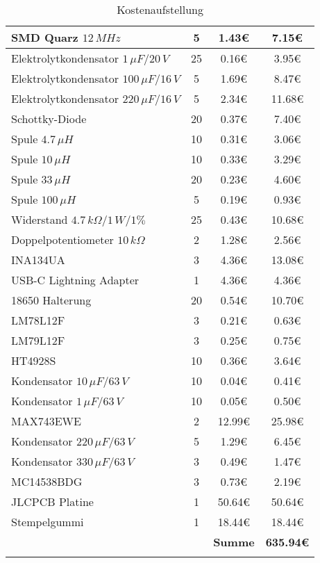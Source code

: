 \begin{longtable}{l|c|c|c}
      {SMD Quarz $12\,MHz$} & {5} & {1.43\euro{}} & {7.15\euro{}} \\
      \hline
      {Elektrolytkondensator $1\,\mu F$/$20\,V$} & {25} & {0.16\euro{}} & {3.95\euro{}} \\
      \hline
      {Elektrolytkondensator $100\,\mu F$/$16\,V$} & {5} & {1.69\euro{}} & {8.47\euro{}} \\
      \hline
      {Elektrolytkondensator  $220\,\mu F$/$16\,V$} & {5} & {2.34\euro{}} & {11.68\euro{}} \\
      \hline
      {Schottky-Diode} & {20} & {0.37\euro{}} & {7.40\euro{}} \\
      \hline
      {Spule $4.7\,\mu H$} & {10} & {0.31\euro{}} & {3.06\euro{}} \\
      \hline
      {Spule $10\,\mu H$} & {10} & {0.33\euro{}} & {3.29\euro{}} \\
      \hline
      {Spule $33\,\mu H$} & {20} & {0.23\euro{}} & {4.60\euro{}} \\
      \hline
      {Spule $100\,\mu H$} & {5} & {0.19\euro{}} & {0.93\euro{}} \\
      \hline
      {Widerstand $4.7\,k\Omega$/$1\,W$/$1\%$} & {25} & {0.43\euro{}} & {10.68\euro{}} \\
      \hline
      {Doppelpotentiometer $10\,k\Omega$} & {2} & {1.28\euro{}} & {2.56\euro{}} \\
      \hline
      {INA134UA} & {3} & {4.36\euro{}} & {13.08\euro{}} \\
      \hline
      {USB-C Lightning Adapter} & {1} & {4.36\euro{}} & {4.36\euro{}} \\
      \hline
      {18650 Halterung} & {20} & {0.54\euro{}} & {10.70\euro{}} \\
      \hline
      {LM78L12F} & {3} & {0.21\euro{}} & {0.63\euro{}} \\
      \hline
      {LM79L12F} & {3} & {0.25\euro{}} & {0.75\euro{}} \\
      \hline
      {HT4928S} & {10} & {0.36\euro{}} & {3.64\euro{}} \\
      \hline
      {Kondensator $10\,\mu F$/$63\,V$} & {10} & {0.04\euro{}} & {0.41\euro{}} \\
      \hline
      {Kondensator $1\,\mu F$/$63\,V$} & {10} & {0.05\euro{}} & {0.50\euro{}} \\
      \hline
      {MAX743EWE} & {2} & {12.99\euro{}} & {25.98\euro{}} \\
      \hline
      {Kondensator $220\,\mu F$/$63\,V$} & {5} & {1.29\euro{}} & {6.45\euro{}} \\
      \hline
      {Kondensator $330\,\mu F$/$63\,V$} & {3} & {0.49\euro{}} & {1.47\euro{}} \\
      \hline
      {MC14538BDG} & {3} & {0.73\euro{}} & {2.19\euro{}} \\
      \hline
      {JLCPCB Platine} & {1} & {50.64\euro{}} & {50.64\euro{}} \\
      \hline
      {Stempelgummi} & {1} & {18.44\euro{}} & {18.44\euro{}} \\
      \hline
            &       & \textbf{Summe} & \textbf{635.94\euro{}} \\
      \caption{Kostenaufstellung}
    \label{tab:Kosten}%
\end{longtable}%
  